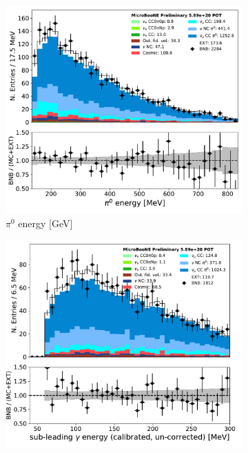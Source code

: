 \begin{figure}[H] 
\begin{center}
    \begin{subfigure}[b]{0.3\textwidth}
    \centering
    \includegraphics[width=1.00\textwidth]{pi0/kinematics/pi0energy_03112020_ALL_scaled.pdf}
    \caption{\label{fig:pi0:kinematics:pi0e} $\pi^0$ energy [GeV]}
    \end{subfigure}
    \begin{subfigure}[b]{0.3\textwidth}
    \centering
    \includegraphics[width=1.00\textwidth]{pi0/kinematics/pi0_energy1_Y_03112020_ALL_scaled.pdf}

\end{subfigure}
\end{center}
\end{figure}
